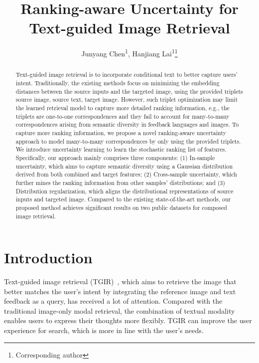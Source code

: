 \documentclass[letterpaper]{article} \usepackage{aaai24}  \usepackage{times}  \usepackage{helvet}  \usepackage{courier}  \usepackage[hyphens]{url}  \usepackage{graphicx} \urlstyle{rm} \def\UrlFont{\rm}  \usepackage{natbib}  \usepackage{caption} \frenchspacing  \setlength{\pdfpagewidth}{8.5in} \setlength{\pdfpageheight}{11in} \usepackage{amsmath,amsfonts}
\title{Ranking-aware Uncertainty for Text-guided Image Retrieval}
\author {
Junyang Chen\textsuperscript{\rm 1},
    Hanjiang Lai\textsuperscript{\rm 1}\thanks{Corresponding author}
}
\begin{document}
\maketitle

\begin{abstract}
Text-guided image retrieval is to incorporate conditional text to better capture users' intent. Traditionally, the existing methods focus on minimizing the embedding distances between the source inputs and the targeted image, using the provided triplets source image, source text, target image. However, such triplet optimization may limit  the learned retrieval model to capture more detailed ranking information, e.g., the triplets are one-to-one correspondences and they fail to account for many-to-many correspondences arising from semantic diversity in feedback languages and images. To capture more ranking information, we propose a novel ranking-aware uncertainty approach to model many-to-many correspondences by only using the provided triplets. We introduce uncertainty learning to learn the stochastic ranking list of features. Specifically, our approach mainly comprises three components: (1) In-sample uncertainty, which aims to capture semantic diversity using a Gaussian distribution derived from both combined and target features; (2) Cross-sample uncertainty, which further mines the ranking information from other samples' distributions; and (3) Distribution regularization, which aligns the distributional representations of  source inputs and targeted image. Compared to the existing state-of-the-art methods, our proposed method achieves significant results on two public datasets for composed image retrieval.
\end{abstract}

\section{Introduction}

Text-guided image retrieval (TGIR)~\cite{vo2019TGIR}, which aims to retrieve the image that better matches the user's intent by integrating the reference image and text feedback as a query, has received a lot of attention. Compared with the traditional image-only modal retrieval, the combination of textual modality enables users to express their thoughts more flexibly. TGIR can improve the user experience for search, which is more in line with the user's needs.  
\end{document}
